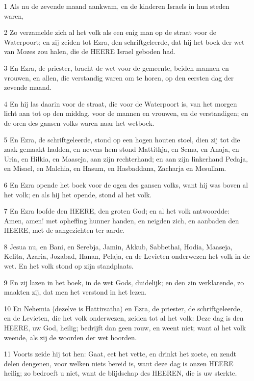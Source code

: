 \par 1 Als nu de zevende maand aankwam, en de kinderen Israels in hun steden waren,
\par 2 Zo verzamelde zich al het volk als een enig man op de straat voor de Waterpoort; en zij zeiden tot Ezra, den schriftgeleerde, dat hij het boek der wet van Mozes zou halen, die de HEERE Israel geboden had.
\par 3 En Ezra, de priester, bracht de wet voor de gemeente, beiden mannen en vrouwen, en allen, die verstandig waren om te horen, op den eersten dag der zevende maand.
\par 4 En hij las daarin voor de straat, die voor de Waterpoort is, van het morgen licht aan tot op den middag, voor de mannen en vrouwen, en de verstandigen; en de oren des gansen volks waren naar het wetboek.
\par 5 En Ezra, de schriftgeleerde, stond op een hogen houten stoel, dien zij tot die zaak gemaakt hadden, en nevens hem stond Mattithja, en Sema, en Anaja, en Uria, en Hilkia, en Maaseja, aan zijn rechterhand; en aan zijn linkerhand Pedaja, en Misael, en Malchia, en Hasum, en Hasbaddana, Zacharja en Mesullam.
\par 6 En Ezra opende het boek voor de ogen des gansen volks, want hij was boven al het volk; en als hij het opende, stond al het volk.
\par 7 En Ezra loofde den HEERE, den groten God; en al het volk antwoordde: Amen, amen! met opheffing hunner handen, en neigden zich, en aanbaden den HEERE, met de aangezichten ter aarde.
\par 8 Jesua nu, en Bani, en Serebja, Jamin, Akkub, Sabbethai, Hodia, Maaseja, Kelita, Azaria, Jozabad, Hanan, Pelaja, en de Levieten onderwezen het volk in de wet. En het volk stond op zijn standplaats.
\par 9 En zij lazen in het boek, in de wet Gods, duidelijk; en den zin verklarende, zo maakten zij, dat men het verstond in het lezen.
\par 10 En Nehemia (dezelve is Hattirsatha) en Ezra, de priester, de schriftgeleerde, en de Levieten, die het volk onderwezen, zeiden tot al het volk: Deze dag is den HEERE, uw God, heilig; bedrijft dan geen rouw, en weent niet; want al het volk weende, als zij de woorden der wet hoorden.
\par 11 Voorts zeide hij tot hen: Gaat, eet het vette, en drinkt het zoete, en zendt delen dengenen, voor welken niets bereid is, want deze dag is onzen HEERE heilig; zo bedroeft u niet, want de blijdschap des HEEREN, die is uw sterkte.
